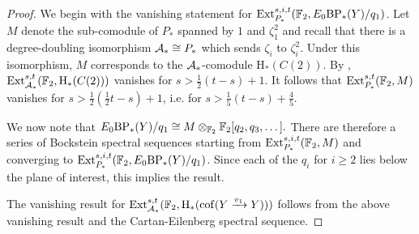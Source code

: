 \begin{proof}
    We begin with the vanishing statement for $\operatorname{\mathrm{Ext}}^{s,i,t} _{P_*} (\operatorname{\mathbb{F}}_2, E_0 \mathrm{BP}_* (Y) / q_1)$. Let $M$ denote the sub-comodule of $P_*$ spanned by $1$ and $\zeta_1 ^2$ and recall that there is a degree-doubling isomorphism $\operatorname{\mathcal{A}}_* \cong P_*$ which sends $\zeta_i$ to $\zeta_i ^2$. Under this isomorphism, $M$ corresponds to the $\operatorname{\mathcal{A}}_*$-comodule $\mathrm{H}_* (C(2))$. By \cite[Theorem 2.1]{AdamsPer}, $\operatorname{\mathrm{Ext}}^{s,t} _{\operatorname{\mathcal{A}}_*} (\operatorname{\mathbb{F}}_2, \mathrm{H}_* (C(2)))$ vanishes for $s > \frac{1}{2} (t-s) + 1.$ It follows that $\operatorname{\mathrm{Ext}}^{s,t} _{P_*} (\operatorname{\mathbb{F}}_2, M)$ vanishes for $s > \frac{1}{2} (\frac{1}{2}t-s) + 1$, i.e. for $s > \frac{1}{5} (t-s) +\frac{4}{5}$.

	We now note that $E_0 \mathrm{BP}_* (Y) / q_1 \cong M \otimes_{\operatorname{\mathbb{F}}_2} \operatorname{\mathbb{F}}_2 [q_2, q_3, \dots].$ There are therefore a series of Bockstein spectral sequences starting from $\operatorname{\mathrm{Ext}}^{s,i,t} _{P_*} (\operatorname{\mathbb{F}}_2, M)$ and converging to $\operatorname{\mathrm{Ext}}^{s,i,t} _{P_*} (\operatorname{\mathbb{F}}_2, E_0 \mathrm{BP}_* (Y) / q_1)$. Since each of the $q_i$ for $i \geq 2$ lies below the plane of interest, this implies the result.

    The vanishing result for $\operatorname{\mathrm{Ext}}^{s,t} _{\operatorname{\mathcal{A}}_*} (\operatorname{\mathbb{F}}_2, \mathrm{H}_* (\operatorname{\mathrm{cof}}(Y \xrightarrow{v_1} Y)))$ follows from the above vanishing result and the Cartan-Eilenberg spectral sequence.


\end{proof}

